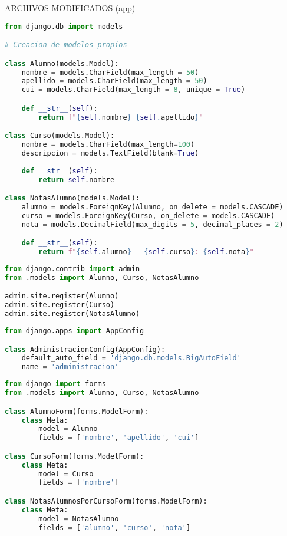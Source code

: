 \documentclass{article}
\begin{document}
        \item ARCHIVOS MODIFICADOS (app)
        
        \begin{lstlisting}[language=Python, caption=models.py]
from django.db import models

# Creacion de modelos propios

class Alumno(models.Model):
    nombre = models.CharField(max_length = 50)
    apellido = models.CharField(max_length = 50)
    cui = models.CharField(max_length = 8, unique = True)

    def __str__(self):
        return f"{self.nombre} {self.apellido}"

class Curso(models.Model):
    nombre = models.CharField(max_length=100)
    descripcion = models.TextField(blank=True)
    
    def __str__(self):
        return self.nombre

class NotasAlumno(models.Model):
    alumno = models.ForeignKey(Alumno, on_delete = models.CASCADE)
    curso = models.ForeignKey(Curso, on_delete = models.CASCADE)
    nota = models.DecimalField(max_digits = 5, decimal_places = 2)

    def __str__(self):
        return f"{self.alumno} - {self.curso}: {self.nota}"

        \end{lstlisting}  
        
        \begin{lstlisting}[language=Python, caption=admin.py]
from django.contrib import admin
from .models import Alumno, Curso, NotasAlumno

admin.site.register(Alumno)
admin.site.register(Curso)
admin.site.register(NotasAlumno)
        \end{lstlisting}
        
        \begin{lstlisting}[language=Python, caption=apps.py]
 from django.apps import AppConfig

class AdministracionConfig(AppConfig):
    default_auto_field = 'django.db.models.BigAutoField'
    name = 'administracion'
        \end{lstlisting}  
        \begin{lstlisting}[language=Python, caption=forms.py]
 from django import forms
from .models import Alumno, Curso, NotasAlumno

class AlumnoForm(forms.ModelForm):
    class Meta:
        model = Alumno
        fields = ['nombre', 'apellido', 'cui']

class CursoForm(forms.ModelForm):
    class Meta:
        model = Curso
        fields = ['nombre']

class NotasAlumnosPorCursoForm(forms.ModelForm):
    class Meta:
        model = NotasAlumno
        fields = ['alumno', 'curso', 'nota']
        \end{lstlisting}  
\end{document}
